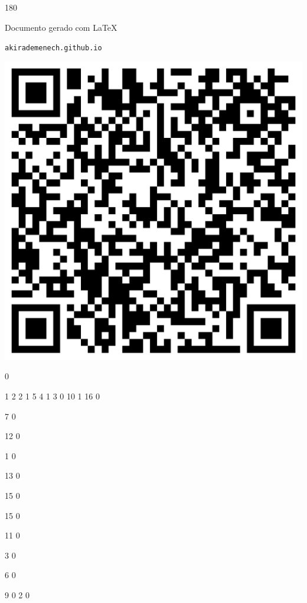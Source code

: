 \documentclass[12pt]{article}
\begin{document}
	\begin{turn}{180}	
		\begin{minipage}{\textwidth}		  
		  Documento gerado com \LaTeX			
		  
		  \texttt{akirademenech.github.io}

		  \includegraphics[height=0.3\textheight]{2e-2.pdf}

		\end{minipage}	
	\end{turn}  
		  
		\vfill  
		  
{
	0	%

	1	%
	2	%
	2	%
	1	%
	5	%
	4	%
	1	%
	3	%
	0	%
	10	%
	1	%
	16	%
	0	%

	7	%
	0	%

	12	%
	0	%

	1	%
	0	%

	13	%
	0	%

	15	%
	0	%

	15	%
	0	%

	11	%
	0	%

	3	%
	0	%

	6	%
	0	%

	9	%
	0	%
	2	%
	0	%

}	  
		    	
\end{document}
